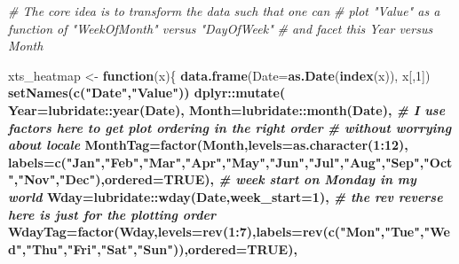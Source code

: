 \documentclass[]{krantz}
\makeatletter
\newenvironment{Shaded}{\begin{snugshade}}{\end{snugshade}}
\newcommand{\CommentTok}[1]{\textcolor[rgb]{0.56,0.35,0.01}{\textit{#1}}}
\newcommand{\ControlFlowTok}[1]{\textcolor[rgb]{0.13,0.29,0.53}{\textbf{#1}}}
\newcommand{\DataTypeTok}[1]{\textcolor[rgb]{0.13,0.29,0.53}{#1}}
\newcommand{\DecValTok}[1]{\textcolor[rgb]{0.00,0.00,0.81}{#1}}
\newcommand{\KeywordTok}[1]{\textcolor[rgb]{0.13,0.29,0.53}{\textbf{#1}}}
\newcommand{\NormalTok}[1]{#1}
\newcommand{\OperatorTok}[1]{\textcolor[rgb]{0.81,0.36,0.00}{\textbf{#1}}}
\newcommand{\OtherTok}[1]{\textcolor[rgb]{0.56,0.35,0.01}{#1}}
\newcommand{\StringTok}[1]{\textcolor[rgb]{0.31,0.60,0.02}{#1}}
\newenvironment{kframe}{%
\medskip{}
\setlength{\fboxsep}{.8em}
 \def\at@end@of@kframe{}%
 \ifinner\ifhmode%
  \def\at@end@of@kframe{\end{minipage}}%
  \begin{minipage}{\columnwidth}%
 \fi\fi%
 \def\FrameCommand##1{\hskip\@totalleftmargin \hskip-\fboxsep
 \colorbox{shadecolor}{##1}\hskip-\fboxsep
     \hskip-\linewidth \hskip-\@totalleftmargin \hskip\columnwidth}%
 \MakeFramed {\advance\hsize-\width
   \@totalleftmargin\z@ \linewidth\hsize
   \@setminipage}}%
 {\par\unskip\endMakeFramed%
 \at@end@of@kframe}
\renewenvironment{Shaded}{\begin{kframe}}{\end{kframe}}
\makeatother
\begin{document}
\begin{Shaded}
\begin{Highlighting}[]
\CommentTok{# The core idea is to transform the data such that one can}
\CommentTok{# plot "Value" as a function of "WeekOfMonth" versus "DayOfWeek"}
\CommentTok{# and facet this Year versus Month}

\NormalTok{xts_heatmap <-}\StringTok{ }\ControlFlowTok{function}\NormalTok{(x)\{}
  \KeywordTok{data.frame}\NormalTok{(}\DataTypeTok{Date=}\KeywordTok{as.Date}\NormalTok{(}\KeywordTok{index}\NormalTok{(x)), x[,}\DecValTok{1}\NormalTok{]) }\OperatorTok{%
\StringTok{    }\KeywordTok{setNames}\NormalTok{(}\KeywordTok{c}\NormalTok{(}\StringTok{"Date"}\NormalTok{,}\StringTok{"Value"}\NormalTok{)) }\OperatorTok{%
\StringTok{    }\NormalTok{dplyr}\OperatorTok{::}\KeywordTok{mutate}\NormalTok{(}
      \DataTypeTok{Year=}\NormalTok{lubridate}\OperatorTok{::}\KeywordTok{year}\NormalTok{(Date),}
      \DataTypeTok{Month=}\NormalTok{lubridate}\OperatorTok{::}\KeywordTok{month}\NormalTok{(Date),}
      \CommentTok{# I use factors here to get plot ordering in the right order}
      \CommentTok{# without worrying about locale}
      \DataTypeTok{MonthTag=}\KeywordTok{factor}\NormalTok{(Month,}\DataTypeTok{levels=}\KeywordTok{as.character}\NormalTok{(}\DecValTok{1}\OperatorTok{:}\DecValTok{12}\NormalTok{),}
                      \DataTypeTok{labels=}\KeywordTok{c}\NormalTok{(}\StringTok{"Jan"}\NormalTok{,}\StringTok{"Feb"}\NormalTok{,}\StringTok{"Mar"}\NormalTok{,}\StringTok{"Apr"}\NormalTok{,}\StringTok{"May"}\NormalTok{,}\StringTok{"Jun"}\NormalTok{,}\StringTok{"Jul"}\NormalTok{,}\StringTok{"Aug"}\NormalTok{,}\StringTok{"Sep"}\NormalTok{,}\StringTok{"Oct"}\NormalTok{,}\StringTok{"Nov"}\NormalTok{,}\StringTok{"Dec"}\NormalTok{),}\DataTypeTok{ordered=}\OtherTok{TRUE}\NormalTok{),}
      \CommentTok{# week start on Monday in my world}
      \DataTypeTok{Wday=}\NormalTok{lubridate}\OperatorTok{::}\KeywordTok{wday}\NormalTok{(Date,}\DataTypeTok{week_start=}\DecValTok{1}\NormalTok{),}
      \CommentTok{# the rev reverse here is just for the plotting order}
      \DataTypeTok{WdayTag=}\KeywordTok{factor}\NormalTok{(Wday,}\DataTypeTok{levels=}\KeywordTok{rev}\NormalTok{(}\DecValTok{1}\OperatorTok{:}\DecValTok{7}\NormalTok{),}\DataTypeTok{labels=}\KeywordTok{rev}\NormalTok{(}\KeywordTok{c}\NormalTok{(}\StringTok{"Mon"}\NormalTok{,}\StringTok{"Tue"}\NormalTok{,}\StringTok{"Wed"}\NormalTok{,}\StringTok{"Thu"}\NormalTok{,}\StringTok{"Fri"}\NormalTok{,}\StringTok{"Sat"}\NormalTok{,}\StringTok{"Sun"}\NormalTok{)),}\DataTypeTok{ordered=}\OtherTok{TRUE}\NormalTok{),}
}}
\end{Highlighting}
\end{Shaded}
\end{document}

